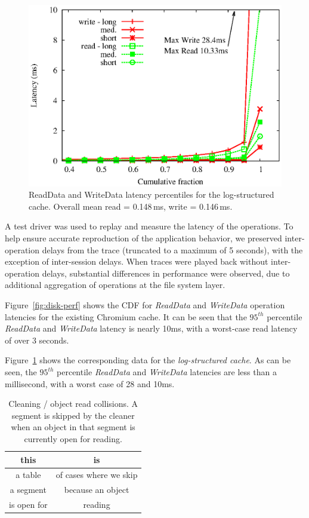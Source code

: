 \documentclass[letterpaper,twocolumn,10pt]{article}
\begin{document}
\begin{figure}
  \begin{center}
    \includegraphics[width=1.04\columnwidth]{graphs/flash-perf}
  \end{center}
  \caption{ReadData and WriteData latency percentiles for the log-structured
    cache. Overall mean read = 0.148\,ms, write = 0.146\,ms.}
  \label{fig:flash-perf} 
\vspace{-0.2in}
\end{figure}

A test driver was used to replay and measure the latency of the operations. To
help ensure accurate reproduction of the application behavior, we preserved
inter-operation delays from the trace (truncated to a maximum of 5 seconds),
with the exception of inter-session delays.  When traces were played back
without inter-operation delays, substantial differences in performance were
observed, due to additional aggregation of operations at the file system layer.

Figure~\ref{fig:disk-perf} shows the CDF for \emph{ReadData} and
\emph{WriteData} operation latencies for the existing Chromium cache.  It can be
seen that the $95^{th}$ percentile \emph{ReadData} and \emph{WriteData} latency
is nearly 10ms, with a worst-case read latency of over 3 seconds.

Figure~\ref{fig:flash-perf} shows the corresponding data for the
\emph{log-structured cache}.  As can be seen, the $95^{th}$ percentile
\emph{ReadData} and \emph{WriteData} latencies are less than a millisecond, with
a worst case of 28 and 10ms.

\begin{table}
\begin{tabular}{cc}
this & is \\
\hline
a table & of cases where we skip \\
a segment & because an object \\
is open for & reading 
\end{tabular}
\caption{Cleaning / object read collisions. A segment is skipped by the cleaner
  when an object in that segment is currently open for reading.}
\label{tab:skips}
\end{table}
\end{document}
